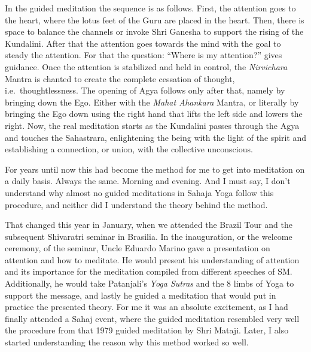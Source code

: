 \documentclass[12pt]{article}
\begin{document}
In the guided meditation the sequence is as follows.
First, the attention goes to the heart, where the lotus feet of the Guru are placed in the heart.
Then, there is space to balance the channels or invoke Shri Ganesha to support the rising of the Kundalini.
After that the attention goes towards the mind with the goal to steady the attention.
For that the question: ``Where is my attention?'' gives guidance.
Once the attention is stabilized and held in control, the \textit{Nirvichara} Mantra is chanted to create the complete cessation of thought, i.e.\ thoughtlessness.
The opening of Agya follows only after that, namely by bringing down the Ego.
Either with the \textit{Mahat Ahankara} Mantra, or literally by bringing the Ego down using the right hand that lifts the left side and lowers the right.
Now, the real meditation starts as the Kundalini passes through the Agya and touches the Sahastrara, enlightening the being with the light of the spirit and establishing a connection, or union, with the collective unconscious.

For years until now this had become the method for me to get into meditation on a daily basis.
Always the same.
Morning and evening.
And I must say, I don't understand why almost no guided meditations in Sahaja Yoga follow this procedure, and neither did I understand the theory behind the method.


That changed this year in January, when we attended the Brazil Tour and the subsequent Shivaratri seminar in Brasilia.
In the inauguration, or the welcome ceremony, of the seminar, Uncle Eduardo Marino gave a presentation on attention and how to meditate.
He would present his understanding of attention and its importance for the meditation compiled from different speeches of SM.
Additionally, he would take Patanjali's \textit{Yoga Sutras} and the 8 limbs of Yoga to support the message, and lastly he guided a meditation that would put in practice the presented theory.
For me it was an absolute excitement, as I had finally attended a Sahaj event, where the guided meditation resembled very well the procedure from that 1979 guided meditation by Shri Mataji.
Later, I also started understanding the reason why this method worked so well.

\end{document}
